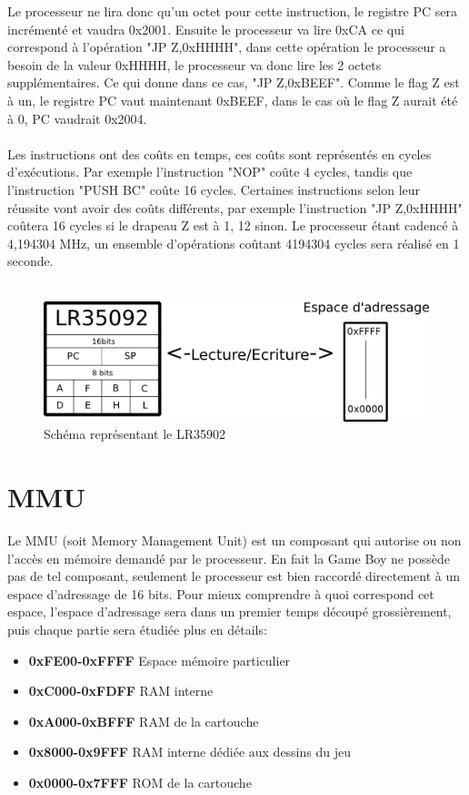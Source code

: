 \documentclass{report}
\begin{document}
Le processeur ne lira donc qu'un octet pour cette instruction, le registre PC sera incrémenté et vaudra 0x2001.
Ensuite le processeur va lire 0xCA ce qui correspond à l'opération "JP Z,0xHHHH", dans cette opération le processeur a besoin de la valeur 0xHHHH, le processeur va donc lire les 2 octets supplémentaires. Ce qui donne dans ce cas, "JP Z,0xBEEF".
Comme le flag Z est à un, le registre PC vaut maintenant 0xBEEF, dans le cas où le flag Z aurait été à 0, PC vaudrait 0x2004.\\\\
Les instructions ont des coûts en temps, ces coûts sont représentés en cycles d'exécutions.
Par exemple l'instruction "NOP" coûte 4 cycles, tandis que l'instruction "PUSH BC" coûte 16 cycles.
Certaines instructions selon leur réussite vont avoir des coûts différents, par exemple l'instruction "JP Z,0xHHHH" coûtera 16 cycles si le drapeau Z est à 1, 12 sinon.
Le processeur étant cadencé à 4,194304 MHz, un ensemble d'opérations coûtant 4194304 cycles sera réalisé en 1 seconde.
\\\\
\begin{figure}[!h]
\centering
\includegraphics[scale=0.80]{images/schema_cpu.png}
\caption{Schéma représentant le LR35902}
\end{figure}

\section{MMU}
Le MMU (soit Memory Management Unit) est un composant qui autorise ou non l'accès en mémoire demandé par le processeur.
En fait la Game Boy ne possède pas de tel composant, seulement le processeur est bien raccordé directement à un espace d'adressage de 16 bits.
Pour mieux comprendre à quoi correspond cet espace, l'espace d'adressage sera
dans un premier temps découpé grossièrement, puis chaque partie sera étudiée
plus en détails:\\
\begin{itemize}
\item \textbf{0xFE00-0xFFFF} Espace mémoire particulier
\item \textbf{0xC000-0xFDFF} RAM interne
\item \textbf{0xA000-0xBFFF} RAM de la cartouche
\item \textbf{0x8000-0x9FFF} RAM interne dédiée aux dessins du jeu
\item \textbf{0x0000-0x7FFF} ROM de la cartouche
\end{itemize}
\end{document}
